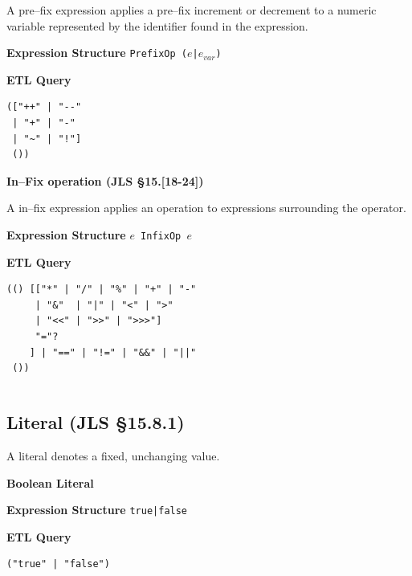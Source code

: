 \begin{chapterBody}
A pre–fix expression applies a pre–fix increment or decrement to a numeric
variable represented by the identifier found in the expression.
\vspace{1em}

\begin{minipage}[t]{.45\linewidth}
\textbf{Expression Structure} \hfill\break
\texttt{PrefixOp ($e$|$e_{var}$)}
\end{minipage}
\begin{minipage}[t]{.45\linewidth}
\textbf{ETL Query}
\begin{lstlisting}[language=etl]
(["++" | "--" 
 | "+" | "-"
 | "~" | "!"]
 ())
\end{lstlisting}
\end{minipage}

\noindent\textbf{In–Fix operation (JLS \S15.[18-24])}

A in–fix expression applies an operation to expressions surrounding the
operator.
\vspace{1em}

\begin{minipage}[t]{.45\linewidth}
\textbf{Expression Structure} \hfill\break
\texttt{$e$ InfixOp $e$}
\end{minipage}
\begin{minipage}[t]{.45\linewidth}
\textbf{ETL Query}
\begin{lstlisting}[language=etl]
(() [["*" | "/" | "%" | "+" | "-"
     | "&"  | "|" | "<" | ">" 
     | "<<" | ">>" | ">>>"]
     "="?
    ] | "==" | "!=" | "&&" | "||"
 ())
\end{lstlisting}
\end{minipage}

\begin{lstlisting}[language=etl]
\end{lstlisting}

\subsection*{Literal (JLS \S15.8.1)}

A literal denotes a fixed, unchanging value.

\noindent\textbf{Boolean Literal}
\vspace{1em}

\begin{minipage}[t]{.45\linewidth}
\textbf{Expression Structure} \hfill\break
\texttt{{\color{bp-blue}true}|{\color{bp-blue}false}}
\end{minipage}
\begin{minipage}[t]{.45\linewidth}
\textbf{ETL Query}
\begin{lstlisting}[language=etl]
("true" | "false")
\end{lstlisting}
\end{minipage}


\end{chapterBody}
